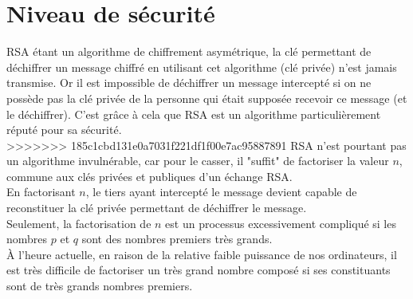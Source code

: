 	\section{Niveau de sécurité}
		RSA étant un algorithme de chiffrement asymétrique, la clé permettant de déchiffrer un message chiffré en utilisant cet algorithme (clé privée) n'est jamais transmise. Or il est impossible de déchiffrer un message intercepté si on ne possède pas la clé privée de la personne qui était supposée recevoir ce message (et le déchiffrer). C'est grâce à cela que RSA est un algorithme particulièrement réputé pour sa sécurité.\\
>>>>>>> 185c1cbd131e0a7031f221df1f00e7ac95887891
		RSA n'est pourtant pas un algorithme invulnérable, car pour le casser, il "suffit" de factoriser la valeur $n$, commune aux clés privées et publiques d'un échange RSA.\\
		En factorisant $n$, le tiers ayant intercepté le message devient capable de reconstituer la clé privée permettant de déchiffrer le message.\\
		Seulement, la factorisation de $n$ est un processus excessivement compliqué si les nombres $p$ et $q$ sont des nombres premiers très grands.\\
		À l'heure actuelle, en raison de la relative faible puissance de nos ordinateurs, il est très difficile de factoriser un très grand nombre composé si ses constituants sont de très grands nombres premiers.
